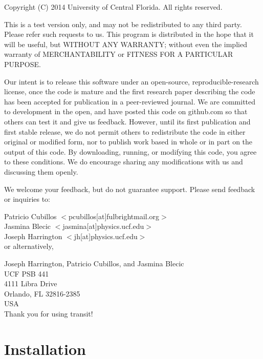 \documentclass[letterpaper, 12pt]{article}
\begin{document}
Copyright (C) 2014 University of Central Florida.  All rights
reserved. \newline

This is a test version only, and may not be redistributed to any third
party. Please refer such requests to us. This program is distributed
in the hope that it will be useful, but WITHOUT ANY WARRANTY; without
even the implied warranty of MERCHANTABILITY or FITNESS FOR A
PARTICULAR PURPOSE. \newline

Our intent is to release this software under an open-source,
reproducible-research license, once the code is mature and the first
research paper describing the code has been accepted for publication
in a peer-reviewed journal. We are committed to development in the
open, and have posted this code on github.com so that others can test
it and give us feedback. However, until its first publication and
first stable release, we do not permit others to redistribute the code
in either original or modified form, nor to publish work based in
whole or in part on the output of this code. By downloading, running,
or modifying this code, you agree to these conditions. We do encourage
sharing any modifications with us and discussing them openly. \newline

\noindent We welcome your feedback, but do not guarantee
support. Please send feedback or inquiries to: \newline

\noindent Patricio Cubillos $<$pcubillos[at]fulbrightmail.org$>$  \\
\noindent Jasmina Blecic    $<$jasmina[at]physics.ucf.edu$>$      \\
\noindent Joseph Harrington $<$jh[at]physics.ucf.edu$>$           \\

\noindent or alternatively, \newline

\noindent Joseph Harrington, Patricio Cubillos, and Jasmina Blecic \\
UCF PSB 441            \\
4111 Libra Drive       \\
Orlando, FL 32816-2385 \\
USA                    \\

Thank you for using transit! \newline


\section{Installation}
\label{sec:installation}
\end{document}

